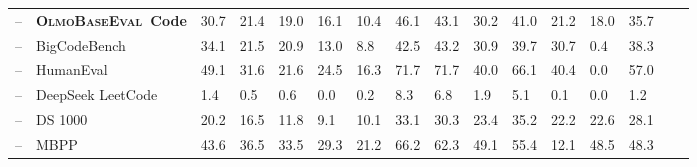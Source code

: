 \documentclass[table]{ai2style/ai2}
\newcommand{\olmothreeeval}{\textsc{OlmoBaseEval}\xspace}
\begin{document}
\begin{table}[t]
{{\begin{NiceTabular}{@{}Hl
P{35pt}C{35pt}C{35pt}C{35pt}C{35pt}|C{35pt}C{35pt}C{35pt}C{35pt}C{35pt}C{35pt}C{35pt}C{35pt}C{35pt}@{}}
\midrule
{}   -- & {\textbf{\olmothreeeval \fontsize{9}{9}\selectfont~Code}}                                              & 30.7                   & 21.4              & 19.0                & 16.1                & 10.4                 & 46.1              & 43.1                   & 30.2                & 41.0                 & 21.2                  & 18.0                    & 35.7             \\
 -- & BigCodeBench                                                                                           & 34.1                   & 21.5              & 20.9                & 13.0                & 8.8                  & 42.5              & 43.2                   & 30.9                & 39.7                 & 30.7                  & 0.4                     & 38.3             \\
 -- & HumanEval                                                                                              & 49.1                   & 31.6              & 21.6                & 24.5                & 16.3                 & 71.7              & 71.7                   & 40.0                & 66.1                 & 40.4                  & 0.0                     & 57.0             \\
 -- & DeepSeek LeetCode                                                                                      & 1.4                    & 0.5               & 0.6                 & 0.0                 & 0.2                  & 8.3               & 6.8                    & 1.9                 & 5.1                  & 0.1                   & 0.0                     & 1.2              \\
 -- & DS 1000                                                                                                & 20.2                   & 16.5              & 11.8                & 9.1                 & 10.1                 & 33.1              & 30.3                   & 23.4                & 35.2                 & 22.2                  & 22.6                    & 28.1             \\
 -- & MBPP                                                                                                   & 43.6                   & 36.5              & 33.5                & 29.3                & 21.2                 & 66.2              & 62.3                   & 49.1                & 55.4                 & 12.1                  & 48.5                    & 48.3             \\

\end{NiceTabular}}}
\end{table}
\end{document}
